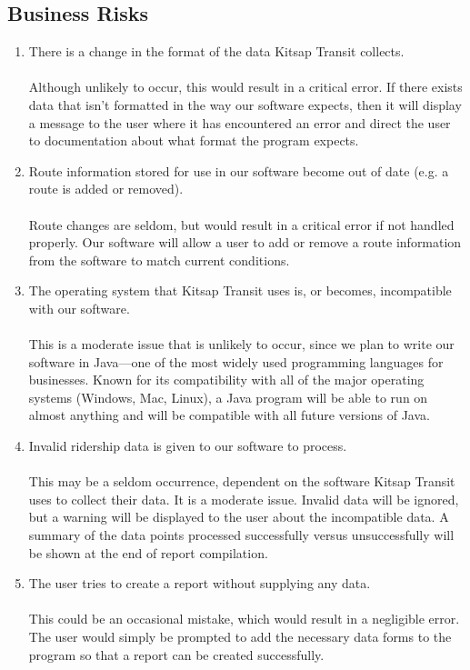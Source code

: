 \subsection{Business Risks}
\begin{enumerate}
	\item There is a change in the format of the data Kitsap Transit collects. \\ \\
	Although unlikely to occur, this would result in a critical error. If there exists data that isn't formatted in the way our software expects, then it will display a message to the user where it has encountered an error and direct the user to documentation about what format the program expects.
	
	\item Route information stored for use in our software become out of date (e.g. a route is added or removed). \\ \\
	Route changes are seldom, but would result in a critical error if not handled properly. Our software will allow a user to add or remove a route information from the software to match current conditions.
	 
	\item The operating system that Kitsap Transit uses is, or becomes, incompatible with our software. \\ \\
	This is a moderate issue that is unlikely to occur, since we plan to write our software in Java---one of the most widely used programming languages for businesses. Known for its compatibility with all of the major operating systems (Windows, Mac, Linux), a Java program will be able to run on almost anything and will be compatible with all future versions of Java. 

	\item Invalid ridership data is given to our software to process. \\ \\
	This may be a seldom occurrence, dependent on the software Kitsap Transit uses to collect their data. It is a moderate issue. Invalid data will be ignored, but a warning will be displayed to the user about the incompatible data. A summary of the data points processed successfully versus unsuccessfully will be shown at the end of report compilation.
	
	\item The user tries to create a report without supplying any data. \\ \\
	This could be an occasional mistake, which would result in a negligible error. The user would simply be prompted to add the necessary data forms to the program so that a report can be created successfully.

\end{enumerate}
